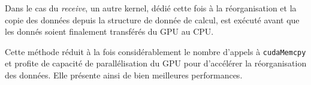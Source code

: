 Dans le cas du \textit{receive}, un autre kernel, dédié cette fois à la réorganisation et la copie des données depuis la structure de donnée de calcul, est exécuté avant que les donnés soient finalement transférés du \acs{GPU} au \acs{CPU}.

Cette méthode réduit à la fois considérablement le nombre d'appels à \texttt{cudaMemcpy} et profite de capacité de parallélisation du \acs{GPU} pour d'accélérer la réorganisation des données. Elle présente ainsi de bien meilleures performances.

\begin{figure}[h]
	\centering
\end{figure}
